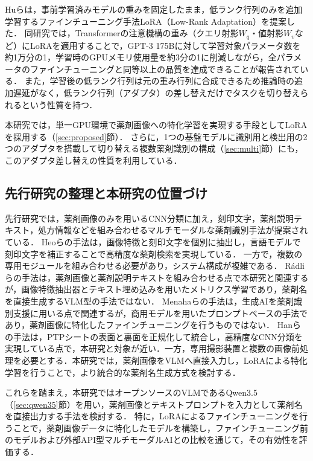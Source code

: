 \documentclass[dvipdfmx]{jsarticle}
\begin{document}
Huら\cite{hu2022lora}は，事前学習済みモデルの重みを固定したまま，低ランク行列のみを追加学習するファインチューニング手法LoRA（Low-Rank Adaptation）を提案した．
同研究では，Transformerの注意機構の重み（クエリ射影$W_q$・値射影$W_v$など）にLoRAを適用することで，GPT-3 175Bに対して学習対象パラメータ数を約1万分の1，学習時のGPUメモリ使用量を約3分の1に削減しながら，全パラメータのファインチューニングと同等以上の品質を達成できることが報告されている．
また，学習後の低ランク行列は元の重み行列に合成できるため推論時の追加遅延がなく，低ランク行列（アダプタ）の差し替えだけでタスクを切り替えられるという性質を持つ．

本研究では，単一GPU環境で薬剤画像への特化学習を実現する手段としてLoRAを採用する（\ref{sec:proposed}節）．
さらに，1つの基盤モデルに識別用と検出用の2つのアダプタを搭載して切り替える複数薬剤識別の構成（\ref{sec:multi}節）にも，このアダプタ差し替えの性質を利用している．

\subsection{先行研究の整理と本研究の位置づけ}

先行研究では，薬剤画像のみを用いるCNN分類に加え，刻印文字，薬剤説明テキスト，処方情報などを組み合わせるマルチモーダルな薬剤識別手法が提案されている．
Heoらの手法は，画像特徴と刻印文字を個別に抽出し，言語モデルで刻印文字を補正することで高精度な薬剤検索を実現している．
一方で，複数の専用モジュールを組み合わせる必要があり，システム構成が複雑である．
Rádliらの手法は，薬剤画像と薬剤説明テキストを組み合わせる点で本研究と関連するが，画像特徴抽出器とテキスト埋め込みを用いたメトリクス学習であり，薬剤名を直接生成するVLM型の手法ではない．
Menahaらの手法は，生成AIを薬剤識別支援に用いる点で関連するが，商用モデルを用いたプロンプトベースの手法であり，薬剤画像に特化したファインチューニングを行うものではない．
Hanらの手法は，PTPシートの表面と裏面を正規化して統合し，高精度なCNN分類を実現している点で，本研究と対象が近い．一方，専用撮影装置と複数の画像前処理を必要とする．本研究では，薬剤画像をVLMへ直接入力し，LoRAによる特化学習を行うことで，より統合的な薬剤名生成方式を検討する．

これらを踏まえ，本研究ではオープンソースのVLMであるQwen3.5（\ref{sec:qwen35}節）を用い，薬剤画像とテキストプロンプトを入力として薬剤名を直接出力する手法を検討する．
特に，LoRA\cite{hu2022lora}によるファインチューニングを行うことで，薬剤画像データに特化したモデルを構築し，ファインチューニング前のモデルおよび外部API型マルチモーダルAIとの比較を通じて，その有効性を評価する．
\end{document}
